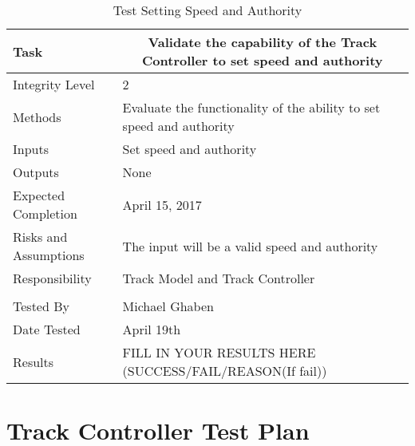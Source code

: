 \documentclass[]{article}
\begin{document}
\begin{table}[H]
	\centering
	\caption{Test Setting Speed and Authority}
	\begin{tabular}{|l|l|}
		\hline
		Task & \multicolumn{1}{c|}{Validate the capability of the Track Controller to set speed and authority} \\ \hline
		Integrity Level & 2\\ \hline
		Methods & Evaluate the functionality of the ability to set speed and authority \\ \hline
		Inputs &  Set speed and authority\\ \hline
		Outputs &  \parbox[t]{10cm}{None}\\ \hline
		Expected Completion & April 15, 2017\\ \hline
		Risks and Assumptions & The input will be a valid speed and authority \\ \hline
		Responsibility & Track Model and Track Controller\\ \hline
		\\ \hline
		Tested By   &  Michael Ghaben\\	\hline
		Date Tested & \parbox[t]{10cm}{April 19th}\\ \hline
		Results & FILL IN YOUR RESULTS HERE (SUCCESS/FAIL/REASON(If fail))\\ \hline
	\end{tabular}
\end{table}

\section{Track Controller Test Plan}
\end{document}
